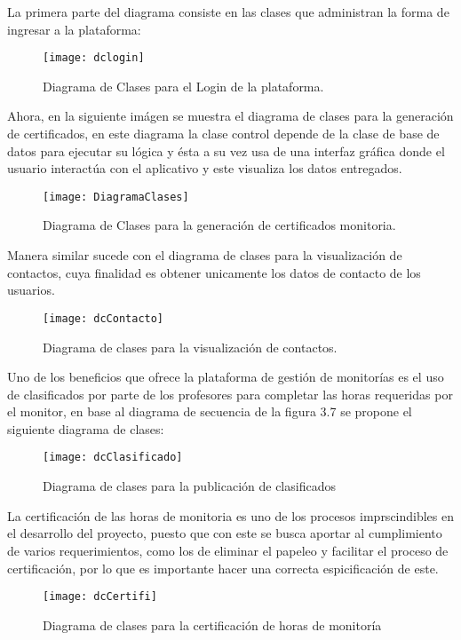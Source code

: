 La primera parte del diagrama consiste en las clases que administran la forma de ingresar a la plataforma:
\begin{figure}[H]
	\centering
	\texttt{[image: dclogin]}
    \centering
    \caption{Diagrama de Clases para el Login de la plataforma.}
	\label{fig:dClaLogin}
\end{figure}

\newpage
Ahora, en la siguiente imágen se muestra el diagrama de clases para la generación de certificados, en este diagrama la clase control depende de la clase de base de datos para ejecutar su lógica y ésta a su vez usa de una interfaz gráfica donde el usuario interactúa con el aplicativo y este visualiza los datos entregados.

\begin{figure}[H]
	\centering
	\texttt{[image: DiagramaClases]}
    \centering
    \caption{Diagrama de Clases para la generación de certificados monitoria.}
	\label{fig:dClaCertificado}
\end{figure}


Manera similar sucede con el diagrama de clases para la visualización de contactos, cuya finalidad es obtener unicamente los datos de contacto de los usuarios.
\begin{figure}[H]
	\centering
	\texttt{[image: dcContacto]}
    \centering
    \caption{Diagrama de clases para la visualización de contactos.}
	\label{fig:dClaContacto}
\end{figure}
\newpage
\clearpage
Uno de los beneficios que ofrece la plataforma de gestión de monitorías es el uso de clasificados por parte de los profesores para completar las horas requeridas por el monitor, en base al diagrama de secuencia de la figura 3.7 se propone el siguiente diagrama de clases:

\begin{figure}[H]
	\centering
	\texttt{[image: dcClasificado]}
    \centering
    \caption{Diagrama de clases para la publicación de clasificados}
	\label{fig:dClaClasificado}
\end{figure}

La certificación de las horas de monitoria es uno de los procesos imprscindibles en el desarrollo del proyecto, puesto que con este se busca aportar al cumplimiento de varios requerimientos, como los de eliminar el papeleo y facilitar el proceso de certificación, por lo que es importante hacer una correcta espicificación de este.
\begin{figure}[H]
	\centering
	\texttt{[image: dcCertifi]}
    \centering
    \caption{Diagrama de clases para la certificación de horas de monitoría}
	\label{fig:dClaCertifi}
\end{figure}

